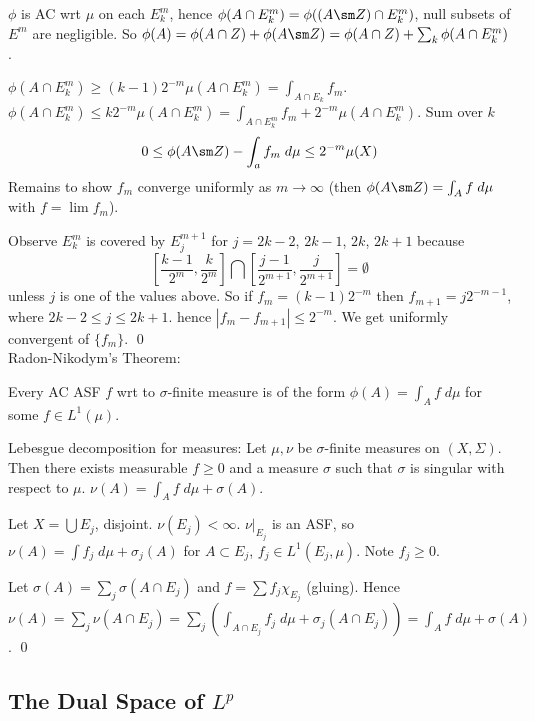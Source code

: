$\phi$ is AC wrt $\mu$ on each $E_k^m$, hence $\phi(A \cap E_k^m)= \phi((A \sm Z) \cap E_k^m)$, null subsets of $E^m$ are negligible. So $\phi(A) = \phi(A \cap Z) + \phi(A \sm Z) = \phi(A \cap Z) + \sum_k \phi(A \cap E_k^m)$. 


$\phi(A \cap E_k^m) \geq (k-1) 2^{-m} \mu(A \cap E_k^m)= \int_{A \cap E_k} f_m$. $\phi(A \cap E_k^m) \leq k 2^{-m} \mu(A \cap E_k^m)= \int_{A \cap E_k^m} f_m + 2^{-m} \mu(A \cap E_k^m)$. Sum over $k$
        \[
        0 \leq \phi(A \sm Z) - \int_a f_m \; d\mu \leq 2^{-m} \mu(X)
        \]
Remains to show $f_m$ converge uniformly as $m \to \infty$ (then $\phi(A \sm Z)= \int_A f \; d\mu$ with $f= \lim f_m$). 


Observe $E_k^m$ is covered by $E_j^{m+1}$ for $j= 2k-2$, $2k-1$, $2k$, $2k+1$ because
	\[
	\left[ \dfrac{k-1}{2^m}, \dfrac{k}{2^m} \right] \bigcap \left[ \dfrac{j-1}{2^{m+1}}, \dfrac{j}{2^{m+1}} \right]= \emptyset
	\]
unless $j$ is one of the values above. So if $f_m = (k-1) 2^{-m}$ then $f_{m+1}= j 2^{-m-1}$, where $2k-2 \leq j \leq 2k+1$. hence $|f_m- f_{m+1}| \leq 2^{-m}$. We get uniformly convergent of $\{f_m\}$. \qed \\



Radon-Nikodym's Theorem:

Every AC ASF $f$ wrt to $\sigma$-finite measure is of the form $\phi(A)= \int_A f \; d\mu$ for some $f \in L^1(\mu)$. 



Lebesgue decomposition for measures: Let $\mu, \nu$ be $\sigma$-finite measures on $(X,\Sigma)$. Then there exists measurable $f \geq 0$ and a measure $\sigma$ such that $\sigma$ is singular with respect to $\mu$. $\nu(A)= \int_A f \; d\mu + \sigma(A)$.

\pf Let $X= \bigcup E_j$, disjoint. $\nu(E_j)< \infty$. $\nu \big|_{E_j}$ is an ASF, so $\nu(A)= \int f_j \; d\mu + \sigma_j(A)$ for $A \subset E_j$, $f_j \in L^1(E_j, \mu)$. Note $f_j \geq 0$.

Let $\sigma(A) = \sum_j \sigma(A \cap E_j)$ and $f= \sum f_j \chi_{E_j}$ (gluing). Hence $\nu(A)= \sum_j \nu(A \cap E_j)= \sum_j (\int_{A \cap E_j} f_j \; d\mu+ \sigma_j(A \cap E_j))= \int_A f \; d\mu + \sigma(A)$. \qed \\





\subsection{The Dual Space of $L^p$}

